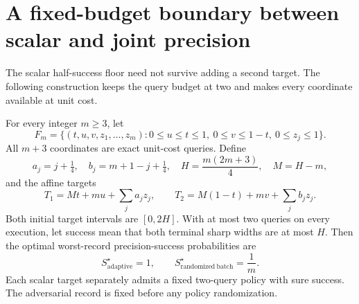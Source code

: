\section{A fixed-budget boundary between scalar and joint precision}
\label{sec:two-target-boundary}
The scalar half-success floor need not survive adding a second target.
The following construction keeps the query budget at two and makes every
coordinate available at unit cost.

\begin{theorem}
\label{thm:two-target-collapse}
For every integer $m\geq3$, let
\[
 F_m=\{(t,u,v,z_1,\ldots,z_m):0\leq u\leq t\leq1,
             \ 0\leq v\leq1-t,\ 0\leq z_j\leq1\}.
\]
All $m+3$ coordinates are exact unit-cost queries. Define
\[
 a_j=j+\tfrac14,\quad b_j=m+1-j+\tfrac14,\quad
 H=\frac{m(2m+3)}4,\quad M=H-m,
\]
and the affine targets
\[
 T_1=Mt+mu+\sum_j a_jz_j,\qquad
 T_2=M(1-t)+mv+\sum_j b_jz_j.
\]
Both initial target intervals are $[0,2H]$. With at most two queries on
every execution, let success mean that both terminal sharp widths are at
most $H$. Then the optimal worst-record precision-success probabilities are
\[
 S^{\star}_{\mathrm{adaptive}}=1,\qquad
 S^{\star}_{\mathrm{randomized\ batch}}=\frac1m.
\]
Each scalar target separately admits a fixed two-query policy with sure
success. The adversarial record is fixed before any policy randomization.
\end{theorem}

